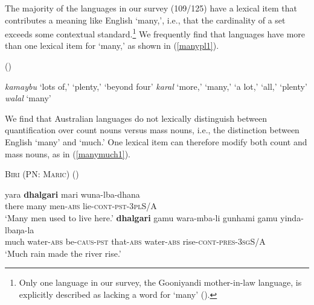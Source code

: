 \documentclass[12pt,egregdoesnotlikesansseriftitles]{scrartcl}
\makeatletter
\newcommand{\ofy}{/125} %
\makeatother
\begin{document}
The majority of the languages in our survey (109\ofy) have a lexical item that contributes a meaning like English `many,', i.e., that the cardinality of a set exceeds some contextual standard.\footnote{Only one language in our survey, the Gooniyandi mother-in-law language, is explicitly described as lacking a word for `many' (\citealt[636]{mcgregor89}).} We frequently find that languages  have more than one lexical item for `many,' as shown in (\ref{manypl1}). %

\begin{exe}
  (\citealt{sharpe98}) \label{manypl1}
  \begin{xlist}
    \ex \textit{kamaybu} `lots of,' `plenty,' `beyond four'
    \ex \textit{karal} `more,' `many,' `a lot,' `all,' `plenty'
    \ex \textit{walal}  `many' 
  \end{xlist} 
\end{exe}

We find that Australian languages do not lexically distinguish between quantification over count nouns versus mass nouns, i.e., the distinction between English `many' and `much.' One lexical item can therefore modify both count and mass nouns, as in (\ref{manymuch1}).

\begin{exe}
\ex \textsc{Biri (PN: Maric}) (\cite[54]{terrill98}) \label{manymuch1}
\begin{xlist} 
\ex  \gll  yara    \textbf{dhalgari}    mari        wuna-lba-dhana \\
    there    many        men-\textsc{abs}    lie-\textsc{cont-pst}-3\textsc{pl}S/A \\
    `Many men used to live here.'
\ex \gll \textbf{dhalgari}    gamu        wara-mba-li        gunhami    gamu     yinda-lbaŋa-la  \\   
    much        water-\textsc{abs}    be\textsc{-caus-pst}    that-\textsc{abs}    water-\textsc{abs}  rise-\textsc{cont-pres}-3\textsc{sg}S/A\\
    `Much rain made the river rise.'
\end{xlist}
\end{exe}
\end{document}
